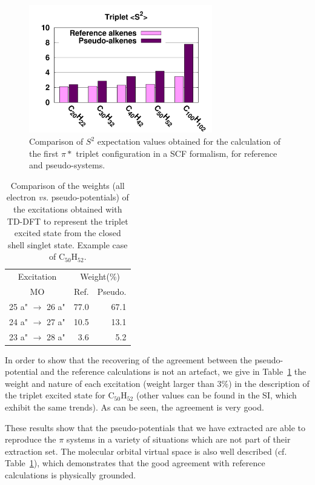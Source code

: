\documentclass[aip]{revtex4-1}
\begin{document}
\begin{figure}
\begin{center}
\includegraphics[width=8cm]{long_pbe0_s2}
\end{center}
\caption{Comparison of $S^2$ expectation values obtained for the calculation
of the first $\pi*$ triplet configuration in a SCF formalism, for reference
and pseudo-systems.}
\label{fig:ssquare}
\end{figure}

\begin{table}[ht]
\caption{\label{tab:coef}Comparison of the weights (all electron \emph{vs.} pseudo-potentials)
of the excitations obtained with TD-DFT
to represent the triplet excited state from the closed shell singlet state.
Example case of C$_{50}$H$_{52}$.}
\begin{tabular}{c c r r}
\hline\hline
\multicolumn{2}{c}{Excitation} & \multicolumn{2}{c}{Weight(\%)}\\
\multicolumn{2}{c}{MO} & Ref. & Pseudo.\\
\hline
\multicolumn{2}{c}{25 a" \(\rightarrow\) 26 a"} & 77.0 &   67.1  \\
\multicolumn{2}{c}{24 a" \(\rightarrow\) 27 a"} & 10.5 &   13.1  \\
\multicolumn{2}{c}{23 a" \(\rightarrow\) 28 a"} & 3.6  &    5.2  \\
\hline\hline
\end{tabular}
\end{table}

In order to show that the recovering of the agreement between the pseudo-potential
and the reference calculations is not an artefact, we give in Table~\ref{tab:coef}
the weight and nature of each excitation (weight larger than 3\%)
in the description of the triplet excited state for
C$_{50}$H$_{52}$ (other values can be found in the SI, which exhibit the same trends).
As can be seen, the agreement is very good. 

These results show that the pseudo-potentials that we have extracted are able to reproduce the
$\pi$ systems in a variety of situations which are not part of their extraction set.
The molecular orbital virtual space is also well described (cf. Table~\ref{tab:coef}),
which demonstrates that the good agreement with reference calculations is
physically grounded.
\end{document}
